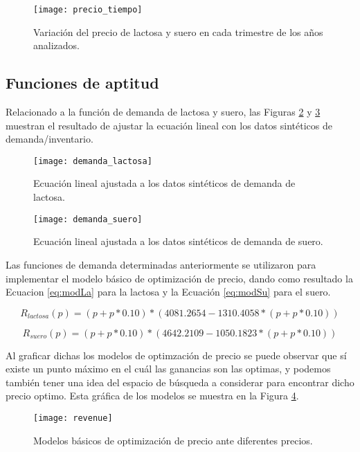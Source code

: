 \begin{figure}[htbp]
\centering
\texttt{[image: precio\_tiempo]}
\caption{Variación del precio de lactosa y suero en cada trimestre de los años analizados.}
\label{fig:trimestres}
\end{figure}


\FloatBarrier
\subsection{Funciones de aptitud}
Relacionado a la función de demanda de lactosa y suero, las Figuras \ref{fig:D_lactosa} y \ref{fig:D_suero} muestran el resultado de ajustar la ecuación lineal con los datos sintéticos de demanda/inventario.

\begin{figure}[htbp]
\centering
\texttt{[image: demanda\_lactosa]}
\caption{Ecuación lineal ajustada a los datos sintéticos de demanda de lactosa.}
\label{fig:D_lactosa}
\end{figure}

\begin{figure}[htbp]
\centering
\texttt{[image: demanda\_suero]}
\caption{Ecuación lineal ajustada a los datos sintéticos de demanda de suero.}
\label{fig:D_suero}
\end{figure}

\FloatBarrier
Las funciones de demanda determinadas anteriormente se utilizaron para implementar el modelo básico de optimización de precio, dando como resultado la Ecuacion \ref{eq:modLa} para la lactosa y la Ecuación \ref{eq:modSu} para el suero.

\begin{equation}\label{eq:modLa}
R_{lactosa}(p)=(p + p*0.10)*(4081.2654 - 1310.4058*(p + p*0.10))
\end{equation}

\begin{equation}\label{eq:modSu}
R_{suero}(p)=(p + p*0.10)*(4642.2109 - 1050.1823*(p + p*0.10))
\end{equation}

Al graficar dichas los modelos de optimzación de precio se puede observar que sí existe un punto máximo en el cuál las ganancias son las optimas, y podemos también tener una idea del espacio de búsqueda a considerar para encontrar dicho precio optimo. Esta gráfica de los modelos se muestra en la Figura \ref{fig:modelos}.

\begin{figure}[htbp]
\centering
\texttt{[image: revenue]}
\caption{Modelos básicos de optimización de precio ante diferentes precios.}
\label{fig:modelos}
\end{figure}

